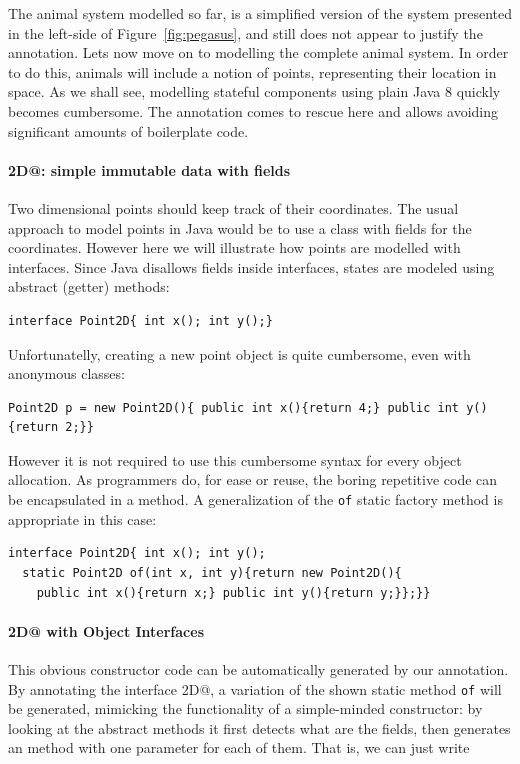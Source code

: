 The animal system modelled so far, is a simplified version of the
system presented in the left-side of Figure~\ref{fig:pegasus}, and still does not appear to 
justify the \mixin annotation. Lets now move on to modelling 
the complete animal system. In order to do this, animals will include 
a notion of points, representing their location in space. As we shall
see, modelling stateful components using plain Java 8 quickly becomes 
cumbersome. The \mixin annotation comes to rescue here and 
allows avoiding significant amounts of boilerplate code.

\paragraph{\Q@Point2D@: simple immutable data with fields}
Two dimensional points should keep track of their coordinates.  The usual
approach to model points in Java would be to use a class with fields for the
coordinates. However here we will illustrate how points are modelled with
interfaces. Since Java disallows fields inside interfaces, states are modeled
using abstract (getter) methods:

\begin{lstlisting}
interface Point2D{ int x(); int y();}
\end{lstlisting}

\noindent Unfortunatelly, creating a new point object is quite cumbersome, even
with anonymous classes:

\begin{lstlisting}
Point2D p = new Point2D(){ public int x(){return 4;} public int y(){return 2;}}
\end{lstlisting}

\noindent However it is not required to use this cumbersome syntax for every
object allocation. As programmers do, for ease or reuse, the boring
repetitive code can be encapsulated in a method. A generalization of the
\texttt{of} static factory method is appropriate in this case:
\begin{lstlisting}
interface Point2D{ int x(); int y();
  static Point2D of(int x, int y){return new Point2D(){
    public int x(){return x;} public int y(){return y;}};}}
\end{lstlisting}

\vspace{-5pt}
\paragraph{\Q@Point2D@ with Object Interfaces}
This obvious constructor code can be automatically generated by our \mixin
annotation.  By annotating the interface \Q@Point2D@, a variation of the shown
static method \texttt{of} will be generated, mimicking the functionality of a
simple-minded constructor: by looking at the abstract methods it first detects
what are the fields, then generates an \Q@of@ method with one parameter for each
of them. That is, we can just write

